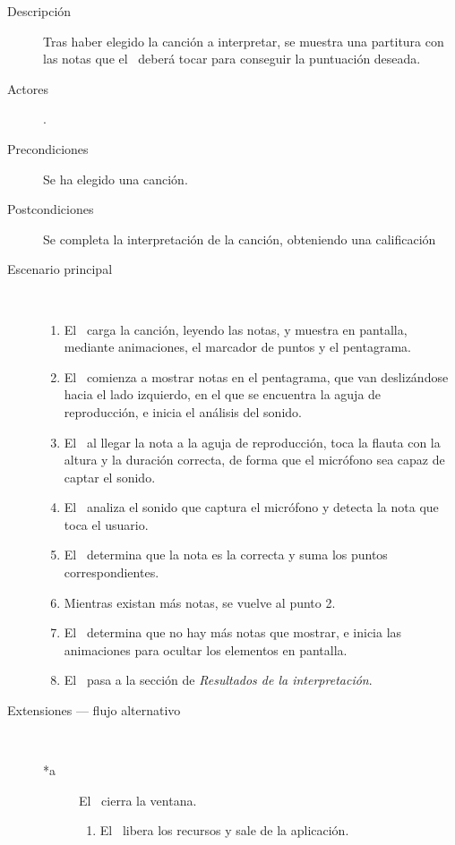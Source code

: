 \begin{description}
\item [Descripción] Tras haber elegido la canción a interpretar, se muestra una
  partitura con las notas que el \jugador\ deberá tocar para conseguir la puntuación deseada.
\item [Actores] \jugador.
\item [Precondiciones] Se ha elegido una canción.
\item [Postcondiciones] Se completa la interpretación de la canción, obteniendo una calificación
\item [Escenario principal] $\quad$
  \begin{enumerate}
  \item El \sistema\ carga la canción, leyendo las notas, y muestra en pantalla,
    mediante animaciones, el marcador de puntos y el pentagrama.
  \item El \sistema\ comienza a mostrar notas en el pentagrama, que van
    deslizándose hacia el lado izquierdo, en el que se encuentra la aguja de
    reproducción, e inicia el análisis del sonido.
  \item El \jugador\, al llegar la nota a la aguja de reproducción, toca la
    flauta con la altura y la duración correcta, de forma que el micrófono sea
    capaz de captar el sonido.
  \item El \sistema\ analiza el sonido que captura el micrófono y detecta la nota que toca el usuario.
  \item El \sistema\ determina que la nota es la correcta y suma los puntos correspondientes.
  \item Mientras existan más notas, se vuelve al punto 2.
  \item El \sistema\ determina que no hay más notas que mostrar, e inicia las
    animaciones para ocultar los elementos en pantalla.
  \item El \sistema\ pasa a la sección de \textit{Resultados de la interpretación}.
  \end{enumerate}
\item[Extensiones --- flujo alternativo] $\quad$
  \begin{description}

  \item [*a] El \jugador\ cierra la ventana.
    \begin{enumerate}
    \item El \sistema\ libera los recursos y sale de la aplicación.
    \end{enumerate}


\end{description}
\end{description}
